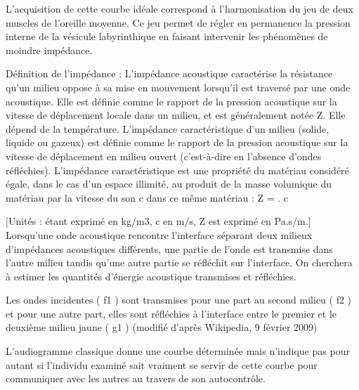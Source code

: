 \documentclass[12pt,french]{report}
\makeatletter
\DeclareRobustCommand{\greektext}{%
  \fontencoding{LGR}\selectfont\def\encodingdefault{LGR}}
\DeclareRobustCommand{\textgreek}[1]{\leavevmode{\greektext #1}}
\let\SF@@footnote\footnote
\def\footnote{\ifx\protect\@typeset@protect
    \expandafter\SF@@footnote
  \else
    \expandafter\SF@gobble@opt
  \fi
}
\edef\SF@gobble@opt{\noexpand\protect
  \expandafter\noexpand\csname SF@gobble@opt \endcsname}
\makeatother
\begin{document}
L'acquisition de cette courbe idéale correspond à l\textquoteright harmonisation
du jeu de deux muscles de l\textquoteright oreille moyenne. Ce jeu
permet de régler en permanence la pression interne de la vésicule
labyrinthique en faisant intervenir les phénomènes de moindre impédance.
\footnote{Définition de l\textquoteright impédance : L'impédance acoustique
caractérise la résistance qu'un milieu oppose à sa mise en mouvement
lorsqu'il est traversé par une onde acoustique. Elle est définie comme
le rapport de la pression acoustique sur la vitesse de déplacement
locale dans un milieu, et est généralement notée Z. Elle dépend de
la température. L'impédance caractéristique d'un milieu (solide, liquide
ou gazeux) est définie comme le rapport de la pression acoustique
sur la vitesse de déplacement en milieu ouvert (c\textquoteright est-à-dire
en l'absence d'ondes réfléchies). L'impédance caractéristique est
une propriété du matériau considéré égale, dans le cas d'un espace
illimité, au produit de la masse volumique du matériau \textgreek{r}
par la vitesse du son c dans ce même matériau : Z = \textgreek{r}
. c

{[}Unités : \textgreek{r} étant exprimé en kg/m3, c en m/s, Z est
exprimé en Pa.s/m.{]} Lorsqu'une onde acoustique rencontre l'interface
séparant deux milieux d'impédances acoustiques différents, une partie
de l'onde est transmise dans l'autre milieu tandis qu'une autre partie
se réfléchit sur l'interface. On cherchera à estimer les quantités
d'énergie acoustique transmises et réfléchies.

Les ondes incidentes ( f1 ) sont transmises pour une part au second
milieu ( f2 ) et pour une autre part, elles sont réfléchies à l\textquoteright interface
entre le premier et le deuxième milieu jaune ( g1 ) (modifié d\textquoteright après
Wikipedia, 9 février 2009) }

L\textquoteright audiogramme classique donne une courbe déterminée
mais n\textquoteright indique pas pour autant si l'individu examiné
sait vraiment se servir de cette courbe pour communiquer avec les
autres au travers de son autocontrôle.
\end{document}
